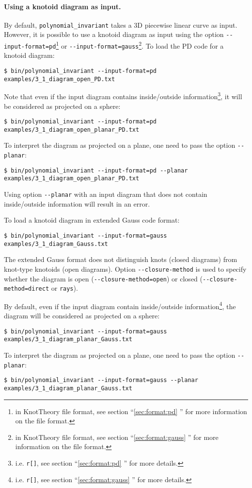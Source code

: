 \paragraph{Using a knotoid diagram as input.}
By default, \lstinline{polynomial_invariant} takes a 3D piecewise linear curve as input. However, it is possible to use a knotoid diagram as input using the option \lstinline{--input-format=pd}\footnote{in KnotTheory file format, see section ``\ref{sec:format:pd} '' for more information on the file format.} or  \lstinline{--input-format=gauss}\footnote{in KnotTheory file format, see section ``\ref{sec:format:gauss} '' for more information on the file format.}. To load the PD code for a knotoid diagram:
\begin{lstlisting}
$ bin/polynomial_invariant --input-format=pd examples/3_1_diagram_open_PD.txt
\end{lstlisting}

Note that even if the input diagram contains inside/outside information\footnote{i.e. \lstinline{r[]}, see section ``\ref{sec:format:pd} '' for more details.}, it will be considered as projected on a sphere:
\begin{lstlisting}
$ bin/polynomial_invariant --input-format=pd examples/3_1_diagram_open_planar_PD.txt
\end{lstlisting}
To interpret the diagram as projected on a plane, one need to pass the option \lstinline{--planar}: 
\begin{lstlisting}
$ bin/polynomial_invariant --input-format=pd --planar examples/3_1_diagram_open_planar_PD.txt
\end{lstlisting}

Using option \lstinline{--planar} with an input diagram that does not contain inside/outside information will result in an error.

To load a knotoid diagram in extended Gauss code format:
\begin{lstlisting}
$ bin/polynomial_invariant --input-format=gauss examples/3_1_diagram_Gauss.txt
\end{lstlisting}
The extended Gauss format does not distinguish knots (closed diagrams) from knot-type knotoids (open diagrams).
Option \lstinline{--closure-method} is used to specify whether the diagram is open (\lstinline{--closure-method=open}) or closed (\lstinline{--closure-method=direct} or \lstinline{rays}).

By default, even if the input diagram contain inside/outside information\footnote{i.e. \lstinline{r[]}, see section ``\ref{sec:format:gauss} '' for more details.}, the diagram will be considered as projected on a sphere:
\begin{lstlisting}
$ bin/polynomial_invariant --input-format=gauss examples/3_1_diagram_planar_Gauss.txt
\end{lstlisting}
To interpret the diagram as projected on a plane, one need to pass the option \lstinline{--planar}: 
\begin{lstlisting}
$ bin/polynomial_invariant --input-format=gauss --planar examples/3_1_diagram_planar_Gauss.txt
\end{lstlisting}

